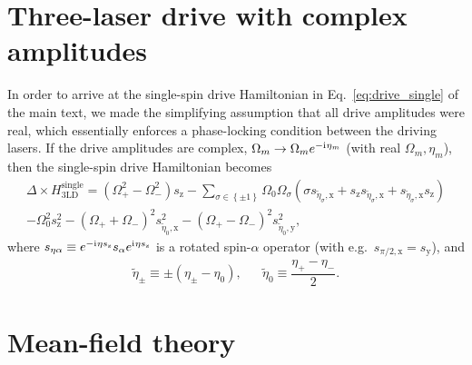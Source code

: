 \documentclass[nofootinbib,twocolumn]{revtex4-2}
\renewcommand{\t}{\text} %
\newcommand{\f}[2]{\dfrac{#1}{#2}} %
\newcommand{\p}[1]{\left(#1\right)} %
\renewcommand{\set}[1]{\left\{#1\right\}} %
\renewcommand{\i}{\mathrm{i}\mkern1mu} %
\newcommand{\1}{\mathds{1}}
\newcommand{\x}{\text{x}}
\newcommand{\y}{\text{y}}
\newcommand{\z}{\text{z}}
\begin{document}
\section{Three-laser drive with complex amplitudes}
\label{sec:full_drive}

In order to arrive at the single-spin drive Hamiltonian in Eq.~\eqref{eq:drive_single} of the main text, we made the simplifying assumption that all drive amplitudes were real, which essentially enforces a phase-locking condition between the driving lasers.
If the drive amplitudes are complex, $\Omega_m\to\Omega_me^{-\i\eta_m}$ (with real $\Omega_m,\eta_m$), then the single-spin drive Hamiltonian becomes
\begin{multline}
  \Delta \times H_{\t{3LD}}^{\t{single}}
  = \p{\Omega_+^2 - \Omega_-^2} s_\z
  - \sum_{\sigma\in\set{\pm1}} \Omega_0 \Omega_\sigma
  \p{\sigma s_{\tilde\eta_\sigma,\x}
    + s_\z s_{\tilde\eta_\sigma,\x}
    + s_{\tilde\eta_\sigma,\x} s_\z} \\
  - \Omega_0^2 s_\z^2 - \p{\Omega_+ + \Omega_-}^2 s_{\tilde\eta_0,\x}^2
  - \p{\Omega_+ - \Omega_-}^2 s_{\tilde\eta_0,\y}^2,
\end{multline}
where $s_{\eta\alpha} \equiv e^{-\i\eta s_\z} s_\alpha e^{\i\eta s_\z}$ is a rotated spin-$\alpha$ operator (with e.g.~$s_{\pi/2,\x}=s_\y$), and
\begin{align}
  \tilde\eta_\pm \equiv \pm \p{\eta_\pm - \eta_0},
  &&
  \tilde\eta_0 \equiv \f{\eta_+ - \eta_-}{2}.
\end{align}

\section{Mean-field theory}
\label{sec:MFT}
\end{document}
